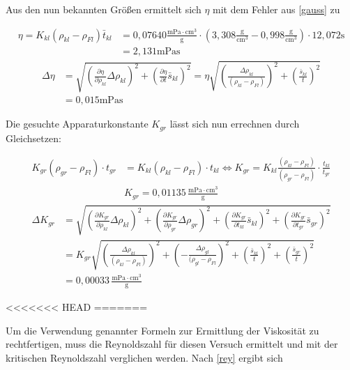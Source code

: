Aus den nun bekannten Größen ermittelt sich $\eta$ mit dem Fehler aus \eqref{gauss} zu

\begin{align}
 \nonumber
 \eta = K_{kl}(\rho_{kl}-\rho_{Fl}) \bar t_{kl} &= 0,07640 \frac{\text{mPa}\cdot\text{cm}^3}{\text{g}} \cdot \left(3,308\frac{\text{g}}{\text{cm$^3$}} - 0,998 \frac{\text{g}}{\text{cm$^3$}}\right)\cdot 12,072 \text{s}\\
 &= 2,131 \text{mPas}
\end{align}
\begin{align}
\nonumber
 \Delta \eta &= \sqrt{\left(\frac{\partial \eta}{\partial \rho_{kl}}\Delta \rho_{kl}\right)^2 + \left(\frac{\partial \eta}{\partial t} \bar s_{kl}\right)^2} = \eta \sqrt{\left(\frac{\Delta \rho_{kl}}{(\rho_{kl}-\rho_{Fl})}\right)^2 + \left(\frac{\bar s_{kl}}{t}\right)^2} \\
 &= 0,015 \text{mPas}
\end{align}

Die gesuchte Apparaturkonstante $K_{gr}$ lässt sich nun errechnen durch Gleichsetzen:

\begin{align}
 \nonumber
 K_{gr}(\rho_{gr} - \rho_{Fl})\cdot t_{gr} &= K_{kl}(\rho_{kl} - \rho_{Fl})\cdot t_{kl} \Leftrightarrow K_{gr} = K_{kl}\frac{(\rho_{kl} - \rho_{Fl})}{(\rho_{gr} - \rho_{Fl})}\cdot\frac{t_{kl}}{t_{gr}}\\
 &K_{gr} = 0,01135\, \frac{\text{mPa}\cdot\text{cm}^3}{\text{g}}
\end{align}
\begin{align}
 \nonumber
\Delta K_{gr} &= \sqrt{\left(\frac{\partial K_{gr}}{\partial \rho_{kl}}\Delta \rho_{kl} \right)^2 + \left(\frac{\partial K_{gr}}{\partial \rho_{gr}}\Delta \rho_{gr} \right)^2 + \left(\frac{\partial K_{gr}}{\partial t_{kl}} \bar s_{kl} \right)^2 + \left(\frac{\partial K_{gr}}{\partial t_{gr}} \bar s_{gr} \right)^2}\\
 \nonumber
 &= K_{gr} \sqrt{\left(\frac{\Delta \rho_{kl}}{(\rho_{kl}-\rho_{Fl})} \right)^2 + \left(-\frac{\Delta \rho_{gl}}{(\rho_{gl}-\rho_{Fl}} \right)^2 + \left(\frac{\bar s_{kl}}{t} \right)^2 + \left(\frac{\bar s_{gr}}{t} \right)^2}\\
 &= 0,00033 \, \frac{\text{mPa}\cdot\text{cm}^3}{\text{g}}
\end{align}

<<<<<<< HEAD
=======

Um die Verwendung genannter Formeln zur Ermittlung der Viskosität zu rechtfertigen, muss die Reynoldszahl für diesen Versuch ermittelt und mit 
der kritischen Reynoldszahl verglichen werden. Nach \eqref{rey} ergibt sich

